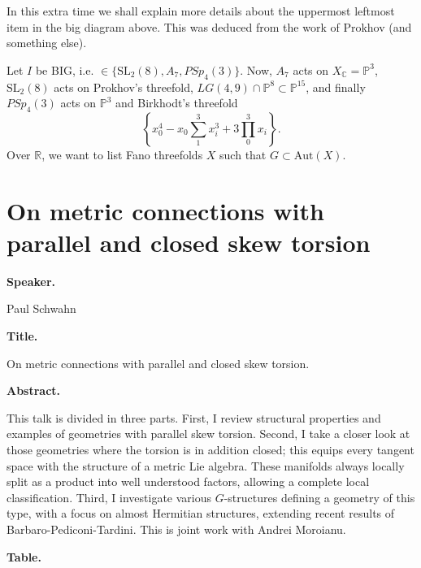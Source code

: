 \medskip\noindent
In this extra time we shall explain
more details about the
uppermost leftmost item in the big
diagram above. This was 
deduced from the work of Prokhov
(and something else).

Let $I$ be BIG, i.e.
$\in \{\text{SL}_2(8),A_7,PSp_4(3)\}$.
Now, $A_7$ acts on $X_\mathbb{C} =
\mathbb{P}^3$,
$\text{SL}_2(8)$ acts on Prokhov's
threefold, $LG(4,9)\cap \mathbb{P}^8
\subset \mathbb{P}^{15}$,
and finally $PSp_4(3)$ acts on
$\mathbb{P}^3$ and Birkhodt's threefold
$$
\left\{x_0^4-x_0 \sum_1^3 x_i^3
+3 \prod_0^3 x_i\right\}.
$$
Over $\mathbb{R}$, we want to list Fano
threefolds $X$ such that $G \subset
\text{Aut}(X)$.

\section{On metric connections with
parallel and closed skew torsion}
\label{section-on-metric-connections-
with-parallel-and-closed-skew-torsion}

\medskip\noindent
{\bf Speaker.}

Paul Schwahn

\medskip\noindent
{\bf Title.}

On metric connections with parallel
and closed skew torsion.

\medskip\noindent
{\bf Abstract.}

This talk is divided in three parts.
First, I review structural properties
and examples of geometries with
parallel skew torsion.
Second, I take a closer look at those
geometries where the torsion is in
addition closed; this equips every
tangent space with the structure of a
metric Lie algebra. These manifolds
always locally split as a product into
well understood factors, allowing a
complete local classification.
Third, I investigate various
$G$-structures defining a geometry of
this type, with a focus on almost
Hermitian structures, extending recent
results of Barbaro-Pediconi-Tardini.
This is joint work with Andrei
Moroianu.

\medskip\noindent
{\bf Table.}

